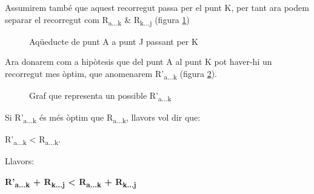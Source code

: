 \documentclass[12pt, letterpaper]{article}
\begin{document}
Assumirem també que aquest recorregut passa per el punt K, per tant ara podem separar el recorregut com R\textsubscript{a...k} \& R\textsubscript{k...j} (figura \ref{demostracio:atoktoj})

\begin{figure}[htbp]
\begin{center}
\caption{Aqüeducte de punt A a punt J passant per K}
\label{demostracio:atoktoj}
\end{center}
\end{figure}

Ara donarem com a hipòtesis que del punt A al punt K pot haver-hi un recorregut mes òptim, que anomenarem R'\textsubscript{a...k} (figura \ref{demostracio:atoktojhypotetical}).

\begin{figure}[htbp]
\begin{center}
\caption{Graf que representa un possible R'\textsubscript{a...k}}
\label{demostracio:atoktojhypotetical}
\end{center}
\end{figure}

Si R'\textsubscript{a...k} és més òptim que R\textsubscript{a...k}, llavors vol dir que: \\
\begin{center}
R'\textsubscript{a...k} < R\textsubscript{a...k}.\\
\end{center}
Llavors:\\
\begin{center}
\textbf{R'\textsubscript{a...k} + R\textsubscript{k...j} < R\textsubscript{a...k} + R\textsubscript{k...j}} \\
\end{center}
\end{document}
